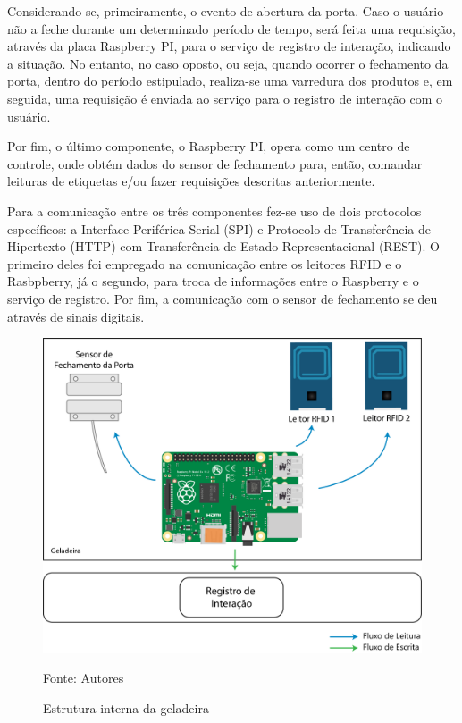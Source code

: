 Considerando-se, primeiramente, o evento de abertura da porta. Caso o usuário não a feche durante um determinado período de tempo, será feita uma requisição, através da placa Raspberry PI, para o serviço de registro de interação, indicando a situação. No entanto, no caso oposto, ou seja, quando ocorrer o fechamento da porta, dentro do período estipulado, realiza-se uma varredura dos produtos e, em seguida, uma requisição é enviada ao serviço para o registro de interação com o usuário.

Por fim, o último componente, o Raspberry PI, opera como um centro de controle, onde obtém dados do sensor de fechamento para, então, comandar leituras de etiquetas e/ou fazer requisições descritas anteriormente.

Para a comunicação entre os três componentes fez-se uso de dois protocolos específicos: a Interface Periférica Serial (SPI) e Protocolo de Transferência de Hipertexto (HTTP) com Transferência de Estado Representacional (REST). O primeiro deles foi empregado na comunicação entre os leitores RFID e o Rasbpberry, já o segundo, para troca de informações entre o Raspberry e o serviço de registro. Por fim, a comunicação com o sensor de fechamento se deu através de sinais digitais.


\begin{figure}[htb]
    \caption{Estrutura interna da geladeira}
    \label{fig:cap4_estr_geladeira}
    \includegraphics[width=\textwidth]{figuras/c4_modelo-logico-hardware.png}
    
    Fonte: Autores
\end{figure}

